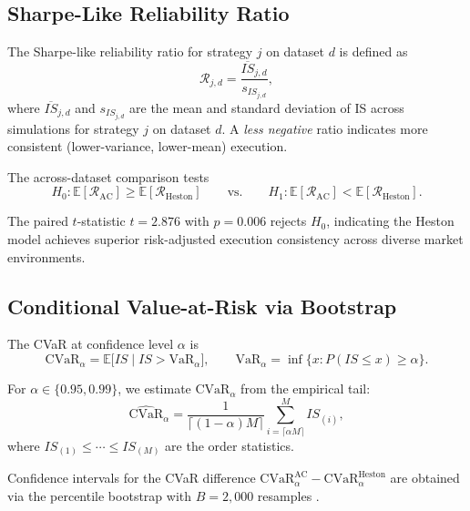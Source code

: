 \documentclass[11pt]{article}
\begin{document}
\subsection{Sharpe-Like Reliability Ratio}

The Sharpe-like reliability ratio for strategy $j$ on dataset $d$ is defined as
\[
\mathcal{R}_{j,d} = \frac{\overline{IS}_{j,d}}{s_{IS_{j,d}}},
\]
where $\overline{IS}_{j,d}$ and $s_{IS_{j,d}}$ are the mean and standard deviation of IS across simulations for strategy $j$ on dataset $d$. A \emph{less negative} ratio indicates more consistent (lower-variance, lower-mean) execution.

The across-dataset comparison tests
\[
H_0: \mathbb{E}[\mathcal{R}_{\text{AC}}] \geq \mathbb{E}[\mathcal{R}_{\text{Heston}}]
\qquad \text{vs.} \qquad
H_1: \mathbb{E}[\mathcal{R}_{\text{AC}}] < \mathbb{E}[\mathcal{R}_{\text{Heston}}].
\]

The paired $t$-statistic $t = 2.876$ with $p = 0.006$ rejects $H_0$, indicating the Heston model achieves superior risk-adjusted execution consistency across diverse market environments.

\subsection{Conditional Value-at-Risk via Bootstrap}

The CVaR at confidence level $\alpha$ \cite{rockafellar2000cvar} is
\[
\mathrm{CVaR}_\alpha = \mathbb{E}\bigl[IS \mid IS > \mathrm{VaR}_\alpha\bigr],
\qquad \mathrm{VaR}_\alpha = \inf\{x : P(IS \leq x) \geq \alpha\}.
\]

For $\alpha \in \{0.95, 0.99\}$, we estimate $\mathrm{CVaR}_\alpha$ from the empirical tail:
\[
\widehat{\mathrm{CVaR}}_\alpha = \frac{1}{\lceil(1-\alpha)M\rceil}\sum_{i=\lceil\alpha M\rceil}^M IS_{(i)},
\]
where $IS_{(1)} \leq \cdots \leq IS_{(M)}$ are the order statistics.

Confidence intervals for the CVaR difference $\mathrm{CVaR}_\alpha^{\text{AC}} - \mathrm{CVaR}_\alpha^{\text{Heston}}$ are obtained via the percentile bootstrap with $B = 2{,}000$ resamples \cite{efron1993bootstrap}.

\printbibliography
\end{document}
